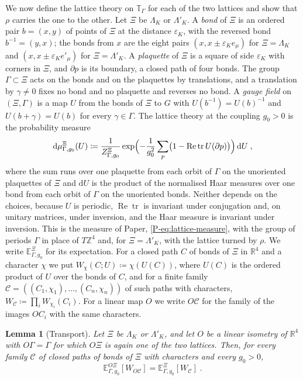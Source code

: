 \documentclass[11pt]{preprint}
\newcommand{\dd}{\mathrm{d}}
\newcommand{\tr}{\operatorname{tr}}
\numberwithin{equation}{section}
\newtheorem{lemma}[theorem]{Lemma}
\theoremstyle{definition}
\theoremstyle{remark}
\theoremstyle{plain}
\begin{document}
We now define the lattice theory on $\mathbb T_\Gamma$ for each of the two lattices and show that $\rho$ carries the one to the other. Let $\Xi$ be $\Lambda_K$ or $\Lambda'_K$. A \emph{bond} of $\Xi$ is an ordered pair $b = (x, y)$ of points of $\Xi$ at the distance $\varepsilon_K$, with the reversed bond $b^{-1} = (y, x)$; the bonds from $x$ are the eight pairs $(x, x \pm \varepsilon_Ke_\mu)$ for $\Xi = \Lambda_K$ and $(x, x \pm \varepsilon_Ke'_\mu)$ for $\Xi = \Lambda'_K$. A \emph{plaquette} of $\Xi$ is a square of side $\varepsilon_K$ with corners in $\Xi$, and $\partial p$ is its boundary, a closed path of four bonds. The group $\Gamma \subset \Xi$ acts on the bonds and on the plaquettes by translations, and a translation by $\gamma \neq 0$ fixes no bond and no plaquette and reverses no bond. A \emph{gauge field} on $(\Xi, \Gamma)$ is a map $U$ from the bonds of $\Xi$ to $G$ with $U(b^{-1}) = U(b)^{-1}$ and $U(b + \gamma) = U(b)$ for every $\gamma \in \Gamma$. The lattice theory at the coupling $g_0 > 0$ is the probability measure
\begin{equation}\label{eq:measure}
    \dd\mu^{\Xi}_{\Gamma,g_0}(U) \coloneqq \frac{1}{Z^\Xi_{\Gamma,g_0}}\exp\Bigl(-\frac{1}{g_0^2}\sum_{p}\bigl(1 - \operatorname{Re}\tr U(\partial p)\bigr)\Bigr)\,\dd U\;,
\end{equation}
where the sum runs over one plaquette from each orbit of $\Gamma$ on the unoriented plaquettes of $\Xi$ and $\dd U$ is the product of the normalised Haar measures over one bond from each orbit of $\Gamma$ on the unoriented bonds. Neither depends on the choices, because $U$ is periodic, $\operatorname{Re}\tr$ is invariant under conjugation and, on unitary matrices, under inversion, and the Haar measure is invariant under inversion. This is the measure of Paper, \eqref{P-eq:lattice-measure}, with the group of periods $\Gamma$ in place of $T\mathbb Z^4$ and, for $\Xi = \Lambda'_K$, with the lattice turned by $\rho$. We write $\mathbb E^\Xi_{\Gamma,g_0}$ for its expectation. For a closed path $C$ of bonds of $\Xi$ in $\mathbb R^4$ and a character $\chi$ we put $W_\chi(C; U) \coloneqq \chi(U(C))$, where $U(C)$ is the ordered product of $U$ over the bonds of $C$, and for a finite family $\mathcal C = ((C_1, \chi_1), \dots, (C_n, \chi_n))$ of such paths with characters, $W_{\mathcal C} \coloneqq \prod_iW_{\chi_i}(C_i)$. For a linear map $O$ we write $O\mathcal C$ for the family of the images $OC_i$ with the same characters.

\begin{lemma}[Transport]\label{lem:transport}
Let $\Xi$ be $\Lambda_K$ or $\Lambda'_K$, and let $O$ be a linear isometry of $\mathbb R^4$ with $O\Gamma = \Gamma$ for which $O\Xi$ is again one of the two lattices. Then, for every family $\mathcal C$ of closed paths of bonds of $\Xi$ with characters and every $g_0 > 0$,
\begin{equation}\label{eq:transport}
    \mathbb E^{O\Xi}_{\Gamma,g_0}[W_{O\mathcal C}] = \mathbb E^{\Xi}_{\Gamma,g_0}[W_{\mathcal C}]\;.
\end{equation}
\end{lemma}
\end{document}

